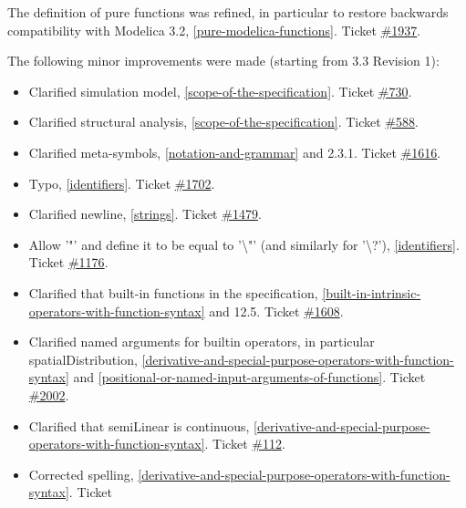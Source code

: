 The definition of pure functions was refined, in particular to restore
backwards compatibility with Modelica 3.2, \autoref{pure-modelica-functions}. Ticket
\href{https://github.com/modelica/ModelicaSpecification/issues/1937}{\#1937}.

The following minor improvements were made (starting from 3.3 Revision 1):

\begin{itemize}
\item
  Clarified simulation model, \autoref{scope-of-the-specification}. Ticket
  \href{https://github.com/modelica/ModelicaSpecification/issues/730}{\#730}.
\item
  Clarified structural analysis, \autoref{scope-of-the-specification}. Ticket
  \href{https://github.com/modelica/ModelicaSpecification/issues/588}{\#588}.
\item
  Clarified meta-symbols, \autoref{notation-and-grammar} and 2.3.1. Ticket
  \href{https://github.com/modelica/ModelicaSpecification/issues/1616}{\#1616}.
\item
  Typo, \autoref{identifiers}. Ticket
  \href{https://github.com/modelica/ModelicaSpecification/issues/1702}{\#1702}.
\item
  Clarified newline, \autoref{strings}. Ticket
  \href{https://github.com/modelica/ModelicaSpecification/issues/1479}{\#1479}.
\item
  Allow '"' and define it to be equal to '\textbackslash{}"' (and
  similarly for '\textbackslash{}?'), \autoref{identifiers}. Ticket
  \href{https://github.com/modelica/ModelicaSpecification/issues/1176}{\#1176}.
\item
  Clarified that built-in functions in the specification, \autoref{built-in-intrinsic-operators-with-function-syntax}
  and 12.5. Ticket
  \href{https://github.com/modelica/ModelicaSpecification/issues/1608}{\#1608}.
\item
  Clarified named arguments for builtin operators, in particular
  spatialDistribution, \autoref{derivative-and-special-purpose-operators-with-function-syntax} and \autoref{positional-or-named-input-arguments-of-functions}. Ticket
  \href{https://github.com/modelica/ModelicaSpecification/issues/2002}{\#2002}.
\item
  Clarified that semiLinear is continuous, \autoref{derivative-and-special-purpose-operators-with-function-syntax}. Ticket
  \href{https://github.com/modelica/ModelicaSpecification/issues/112}{\#112}.
\item
  Corrected spelling, \autoref{derivative-and-special-purpose-operators-with-function-syntax}. Ticket

\end{itemize}
